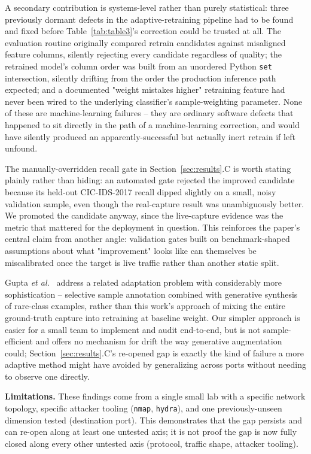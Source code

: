\documentclass[conference]{IEEEtran}
\begin{document}
A secondary contribution is systems-level rather than purely statistical:
three previously dormant defects in the adaptive-retraining pipeline had
to be found and fixed before Table~\ref{tab:table3}'s correction could be
trusted at all. The evaluation routine originally compared retrain
candidates against misaligned feature columns, silently rejecting every
candidate regardless of quality; the retrained model's column order was
built from an unordered Python \texttt{set} intersection, silently
drifting from the order the production inference path expected; and a
documented "weight mistakes higher" retraining feature had never been
wired to the underlying classifier's sample-weighting parameter. None of
these are machine-learning failures -- they are ordinary software defects
that happened to sit directly in the path of a machine-learning
correction, and would have silently produced an apparently-successful but
actually inert retrain if left unfound.

The manually-overridden recall gate in Section~\ref{sec:results}.C is
worth stating plainly rather than hiding: an automated gate rejected the
improved candidate because its held-out CIC-IDS-2017 recall dipped
slightly on a small, noisy validation sample, even though the real-capture
result was unambiguously better. We promoted the candidate anyway, since
the live-capture evidence was the metric that mattered for the deployment
in question. This reinforces the paper's central claim from another
angle: validation gates built on benchmark-shaped assumptions about what
"improvement" looks like can themselves be miscalibrated once the target
is live traffic rather than another static split.

Gupta \textit{et al.}~\cite{gupta2025generative} address a related
adaptation problem with considerably more sophistication -- selective
sample annotation combined with generative synthesis of rare-class
examples, rather than this work's approach of mixing the entire
ground-truth capture into retraining at baseline weight. Our simpler
approach is easier for a small team to implement and audit end-to-end, but
is not sample-efficient and offers no mechanism for drift the way
generative augmentation could; Section~\ref{sec:results}.C's re-opened gap
is exactly the kind of failure a more adaptive method might have avoided
by generalizing across ports without needing to observe one directly.

\textbf{Limitations.} These findings come from a single small lab with a
specific network topology, specific attacker tooling (\texttt{nmap},
\texttt{hydra}), and one previously-unseen dimension tested (destination
port). This demonstrates that the gap persists and can re-open along at
least one untested axis; it is not proof the gap is now fully closed along
every other untested axis (protocol, traffic shape, attacker tooling).
\end{document}
